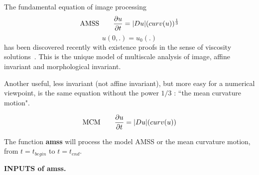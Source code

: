 \def\vfp{\vspace{5mm}}
\def\la{_\lambda }
\def\med{\hbox{med}}
\def\real{I\!\!R}
\def\entier{I\!\!N}
\def\MONO {{\tt [Order Preserving] }}
\def\Morp {{\tt [Morphology] }}
\def\MORP {{\tt [Pure Morphology] }}
\def\CONS {{\tt [Consistency] }}
\def\CONV {{\tt [Convergence] }}
\def\ECHE {{\tt [Scale invariance] }}
\def\ROTA {{\tt [Isom. invariance] }}
\def\AFFI {{\tt [Affine invariance] }}
\def\skipaline {\vspace{4 mm}}

{}

The fundamental equation of image processing
\begin{equation}
\hbox{AMSS} \qquad \frac{\partial u}{\partial t} = \vert Du \vert (curv(u))^{\frac{1}{3}} 
\end{equation}
$$ u(0,.) = u_0(.)$$
has been discovered recently with existence proofs in the sense of viscosity
solutions~\cite{alvarez.guichard.ea:axioms}. 
This is the unique model of multiscale analysis of image, affine invariant 
 and morphological
invariant.

Another useful, less invariant (not affine invariant), but more easy for a numerical viewpoint,
is the same equation without the power $1/3$ : ``the mean curvature motion".

\begin{equation}
\hbox{MCM} \qquad
\frac{\partial u}{\partial t} = \vert Du \vert (curv(u)) 
\end{equation}


The function {\bf amss} will process the model AMSS or the mean curvature motion, from $t = t_{begin}$ to $t = t_{end}$.


\skipaline
{\bf INPUTS of amss.}


